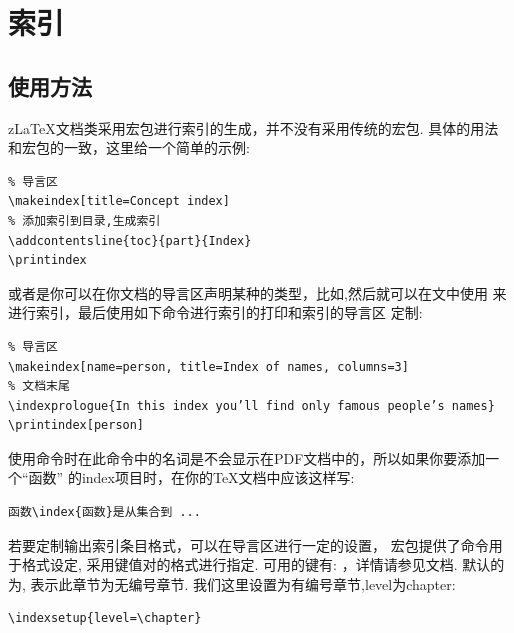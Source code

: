 \section{索引}
\subsection{使用方法}
z\LaTeX{}文档类采用宏包进行索引的生成，并不没有采用传统的宏包.
具体的用法和宏包的一致，这里给一个简单的示例:

\begin{verbatim}
% 导言区
\makeindex[title=Concept index]
% 添加索引到目录,生成索引
\addcontentsline{toc}{part}{Index}
\printindex
\end{verbatim}

或者是你可以在你文档的导言区声明某种的类型，比如,然后就可以在文中使用
 来进行索引，最后使用如下命令进行索引的打印和索引的导言区
定制:

\begin{verbatim}
% 导言区
\makeindex[name=person, title=Index of names, columns=3]
% 文档末尾
\indexprologue{In this index you’ll find only famous people’s names}
\printindex[person]
\end{verbatim}

使用\cmd{\index}命令时在此命令中的名词是不会显示在PDF文档中的，所以如果你要添加一个``函数''
的index项目时，在你的\TeX{}文档中应该这样写:

\begin{verbatim}
函数\index{函数}是从集合到 ...
\end{verbatim}

若要定制\cmd{\printindex}输出索引条目格式，可以在导言区进行一定的设置，
宏包提供了命令\cmd{\indexsetup{}}用于格式设定, 采用键值对的格式进行指定. 可用的键有:
，详情请参见文档. 默认的为,
表示此章节为无编号章节. 我们这里设置为有编号章节,level为chapter:
\begin{verbatim}
\indexsetup{level=\chapter}
\end{verbatim}


